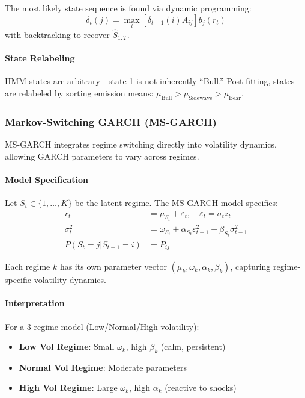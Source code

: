 The most likely state sequence is found via dynamic programming:
\begin{equation}
  \delta_t(j) = \max_{i} \left[ \delta_{t-1}(i) A_{ij} \right] b_j(r_t)
\end{equation}
with backtracking to recover $\hat{S}_{1:T}$.

\paragraph{State Relabeling}

HMM states are arbitrary---state 1 is not inherently ``Bull.'' Post-fitting, states are relabeled by sorting emission means: $\mu_{\text{Bull}} > \mu_{\text{Sideways}} > \mu_{\text{Bear}}$.

\subsubsection{Markov-Switching GARCH (MS-GARCH)}

MS-GARCH integrates regime switching directly into volatility dynamics, allowing GARCH parameters to vary across regimes.

\paragraph{Model Specification}

Let $S_t \in \{1, \ldots, K\}$ be the latent regime. The MS-GARCH model specifies:
\begin{align}
  r_t &= \mu_{S_t} + \varepsilon_t, \quad \varepsilon_t = \sigma_t z_t \\
  \sigma_t^2 &= \omega_{S_t} + \alpha_{S_t} \varepsilon_{t-1}^2 + \beta_{S_t} \sigma_{t-1}^2 \\
  P(S_t = j | S_{t-1} = i) &= P_{ij}
\end{align}

Each regime $k$ has its own parameter vector $(\mu_k, \omega_k, \alpha_k, \beta_k)$, capturing regime-specific volatility dynamics.

\paragraph{Interpretation}

For a 3-regime model (Low/Normal/High volatility):
\begin{itemize}
  \item \textbf{Low Vol Regime}: Small $\omega_k$, high $\beta_k$ (calm, persistent)
  \item \textbf{Normal Vol Regime}: Moderate parameters
  \item \textbf{High Vol Regime}: Large $\omega_k$, high $\alpha_k$ (reactive to shocks)
\end{itemize}

